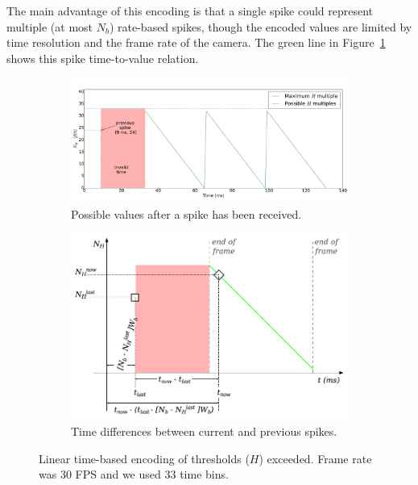 \documentclass[conference]{IEEEtran}
\begin{document}
The main advantage of this encoding is that a single spike could represent multiple (at most $N_{b}$) rate-based spikes, though the encoded values are limited by time resolution and the frame rate of the camera. The green line in Figure~\ref{fig:linear_time_all} shows this spike time-to-value relation. 

\begin{figure}[htb]
  \centering
      
    \begin{subfigure}[b]{0.49\textwidth}
      \includegraphics[width=\textwidth]{spike_values_linear}
      \caption{Possible values after a spike has been received.}
      \label{fig:linear_time_all}
    \end{subfigure}
    
    \begin{subfigure}[b]{0.45\textwidth}
      \includegraphics[width=\textwidth]{new_val_calc_linear}
      \caption{Time differences between current and previous spikes.}
      \label{fig:linear_time_calc}
    \end{subfigure}
  \caption{Linear time-based encoding of thresholds ($H$) exceeded.  Frame rate was 30 FPS and we used 33 time bins.}
  \label{fig:linear_time}
\end{figure} 
\end{document}
